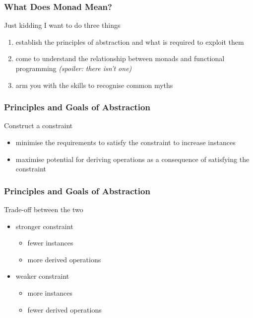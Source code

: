 \begin{frame}
\frametitle{What Does Monad Mean?}
\begin{block}{Just kidding}
I want to do three things
\begin{enumerate}
  \item establish the principles of abstraction and what is required to exploit them
  \item come to understand the relationship between monads and functional programming \emph{\tiny{(spoiler: there isn't one)}} \normalsize
  \item arm you with the skills to recognise common myths
\end{enumerate}
\end{block}
\end{frame}


\begin{frame}
\frametitle{Principles and Goals of Abstraction}
\begin{block}{Construct a constraint}
\begin{itemize}
  \item minimise the requirements to satisfy the constraint to increase instances
  \item maximise potential for deriving operations as a consequence of satisfying the constraint 
\end{itemize}
\end{block}
\end{frame}


\begin{frame}
\frametitle{Principles and Goals of Abstraction}
\begin{block}{Trade-off between the two}
\begin{itemize}
  \item stronger constraint
    \begin{itemize}
      \item fewer instances
      \item more derived operations
    \end{itemize}
  \item weaker constraint
    \begin{itemize}
      \item more instances
      \item fewer derived operations
    \end{itemize}
\end{itemize}
\end{block}
\end{frame}


